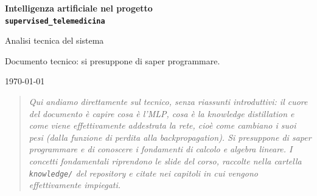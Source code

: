 \documentclass[11pt,a4paper]{report}
\begin{document}
\begin{titlepage}
  \centering
  \vspace*{2cm}
  {\Huge\bfseries Intelligenza artificiale nel progetto\\[0.4em] \texttt{supervised\_telemedicina}\par}
  \vspace{1.2cm}
  {\Large Analisi tecnica del sistema\par}
  \vspace{2.5cm}
  {\large Documento tecnico: si presuppone di saper programmare.\par}
  \vfill
  {\large \today\par}
  \vspace{1cm}
\end{titlepage}

\tableofcontents
\clearpage

% 
% 
% 
% 
% 
% 


\begin{quote}
\itshape
Qui andiamo direttamente sul tecnico, senza riassunti introduttivi: il cuore
del documento è capire cosa è l'MLP, cosa è la knowledge distillation e come
viene effettivamente addestrata la rete, cioè come cambiano i suoi pesi (dalla
funzione di perdita alla backpropagation). Si presuppone di saper programmare
e di conoscere i fondamenti di calcolo e algebra lineare. I concetti
fondamentali riprendono le slide del corso, raccolte nella cartella
\texttt{knowledge/} del repository e citate nei capitoli in cui vengono
effettivamente impiegati.
\end{quote}
\end{document}
